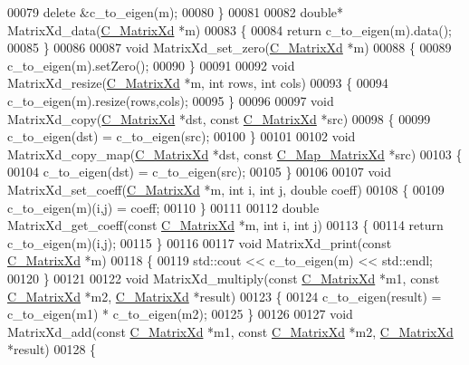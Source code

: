 \begin{DoxyCode}
00079   \textcolor{keyword}{delete} &c\_to\_eigen(m);
00080 \}
00081 
00082 \textcolor{keywordtype}{double}* MatrixXd\_data(\hyperlink{struct_c___matrix_xd}{C\_MatrixXd} *m)
00083 \{
00084   \textcolor{keywordflow}{return} c\_to\_eigen(m).data();
00085 \}
00086 
00087 \textcolor{keywordtype}{void} MatrixXd\_set\_zero(\hyperlink{struct_c___matrix_xd}{C\_MatrixXd} *m)
00088 \{
00089   c\_to\_eigen(m).setZero();
00090 \}
00091 
00092 \textcolor{keywordtype}{void} MatrixXd\_resize(\hyperlink{struct_c___matrix_xd}{C\_MatrixXd} *m, \textcolor{keywordtype}{int} rows, \textcolor{keywordtype}{int} cols)
00093 \{
00094   c\_to\_eigen(m).resize(rows,cols);
00095 \}
00096 
00097 \textcolor{keywordtype}{void} MatrixXd\_copy(\hyperlink{struct_c___matrix_xd}{C\_MatrixXd} *dst, \textcolor{keyword}{const} \hyperlink{struct_c___matrix_xd}{C\_MatrixXd} *src)
00098 \{
00099   c\_to\_eigen(dst) = c\_to\_eigen(src);
00100 \}
00101 
00102 \textcolor{keywordtype}{void} MatrixXd\_copy\_map(\hyperlink{struct_c___matrix_xd}{C\_MatrixXd} *dst, \textcolor{keyword}{const} \hyperlink{struct_c___map___matrix_xd}{C\_Map\_MatrixXd} *src)
00103 \{
00104   c\_to\_eigen(dst) = c\_to\_eigen(src);
00105 \}
00106 
00107 \textcolor{keywordtype}{void} MatrixXd\_set\_coeff(\hyperlink{struct_c___matrix_xd}{C\_MatrixXd} *m, \textcolor{keywordtype}{int} i, \textcolor{keywordtype}{int} j, \textcolor{keywordtype}{double} coeff)
00108 \{
00109   c\_to\_eigen(m)(i,j) = coeff;
00110 \}
00111 
00112 \textcolor{keywordtype}{double} MatrixXd\_get\_coeff(\textcolor{keyword}{const} \hyperlink{struct_c___matrix_xd}{C\_MatrixXd} *m, \textcolor{keywordtype}{int} i, \textcolor{keywordtype}{int} j)
00113 \{
00114   \textcolor{keywordflow}{return} c\_to\_eigen(m)(i,j);
00115 \}
00116 
00117 \textcolor{keywordtype}{void} MatrixXd\_print(\textcolor{keyword}{const} \hyperlink{struct_c___matrix_xd}{C\_MatrixXd} *m)
00118 \{
00119   std::cout << c\_to\_eigen(m) << std::endl;
00120 \}
00121 
00122 \textcolor{keywordtype}{void} MatrixXd\_multiply(\textcolor{keyword}{const} \hyperlink{struct_c___matrix_xd}{C\_MatrixXd} *m1, \textcolor{keyword}{const} \hyperlink{struct_c___matrix_xd}{C\_MatrixXd} *m2, 
      \hyperlink{struct_c___matrix_xd}{C\_MatrixXd} *result)
00123 \{
00124   c\_to\_eigen(result) = c\_to\_eigen(m1) * c\_to\_eigen(m2);
00125 \}
00126 
00127 \textcolor{keywordtype}{void} MatrixXd\_add(\textcolor{keyword}{const} \hyperlink{struct_c___matrix_xd}{C\_MatrixXd} *m1, \textcolor{keyword}{const} \hyperlink{struct_c___matrix_xd}{C\_MatrixXd} *m2, 
      \hyperlink{struct_c___matrix_xd}{C\_MatrixXd} *result)
00128 \{

\end{DoxyCode}
